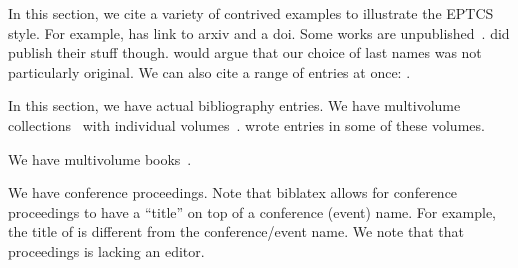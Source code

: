 \documentclass{eptcs}
\begin{document}
\begin{refsection}[c]
  In this section, we cite a variety of contrived examples to illustrate the EPTCS style.
  For example, \textcite{article_1992:_artic_arxiv_with} has link to arxiv and a doi.
  Some works are unpublished~\cite{unpublished_2020:_unpub_work}.
  \textcite{book_2055:_my_inbook_chapt,collection_2020:_my_collec} did publish their stuff though.
  \textcite{article_1992:_artic_with_doi} would argue that our choice of last names was not particularly original.
  We can also cite a range of entries at once: \cite{article_1992:_artic_arxiv_with,article_1992:_artic_with_doi,article_1992:_artic_with_eid_paget,article_1992:_artic_with_page_range}.
  \nocite{*}
  \printbibliography[title={Contrived Examples}]
\end{refsection}

\clearpage

\begin{refsection}[r]
  In this section, we have actual bibliography entries.
  We have multivolume collections~\cite{abramsky_1992:_handb_logic_comput_scien} with individual volumes~\cite{abramsky_2001:_logic_algeb_method, abramsky_1995:_seman_struc, abramsky_1995:_seman_model, abramsky_1993:_backg_comp_struct, abramsky_1992:_backg_mathem_struct}.
  \textcite{tennent_1995:_denot_seman, abramsky_jung_1995:_domain_theor} wrote entries in some of these volumes.

  We have multivolume books~\cite{girard_2006:_le_point_aveug, girard_2007:_vers_limper, girard_2006:_vers_la_perfec}.

  We have conference proceedings.
  Note that biblatex allows for conference proceedings to have a ``title'' on top of a conference (event) name.
  For example, the title of \cite{2002:_proof_system_reliab} is different from the conference/event name.
  We note that that proceedings is lacking an editor.
  \nocite{*}
  \printbibliography[title={Real Examples}]
\end{refsection}
\end{document}
